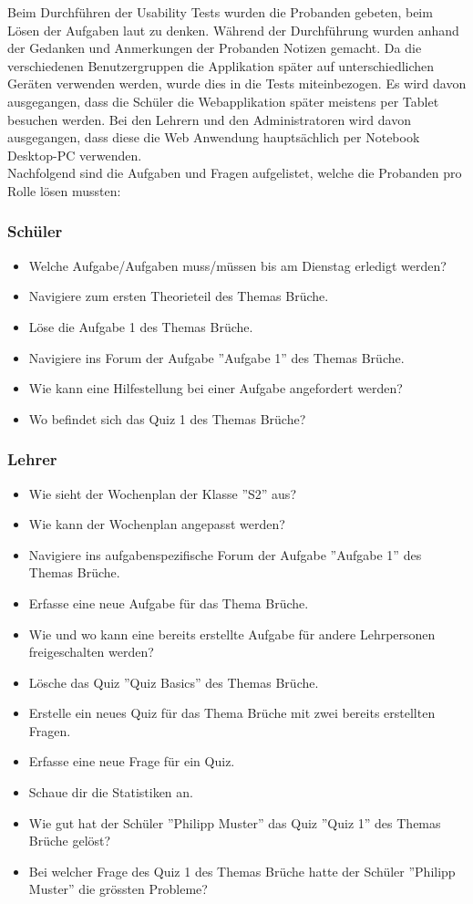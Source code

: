 Beim Durchführen der Usability Tests wurden die Probanden gebeten, beim Lösen der Aufgaben laut zu denken. Während der Durchführung wurden anhand der Gedanken und Anmerkungen der Probanden Notizen gemacht. Da die verschiedenen Benutzergruppen die Applikation später auf unterschiedlichen Geräten verwenden werden, wurde dies in die Tests miteinbezogen. Es wird davon ausgegangen, dass die Schüler die Webapplikation später meistens per Tablet besuchen werden. Bei den Lehrern und den Administratoren wird davon ausgegangen, dass diese die Web Anwendung hauptsächlich per Notebook Desktop-PC verwenden. \\

Nachfolgend sind die Aufgaben und Fragen aufgelistet, welche die Probanden pro Rolle lösen mussten:

\subsubsection*{Schüler}
\begin{itemize}
	\item Welche Aufgabe/Aufgaben muss/müssen bis am Dienstag erledigt werden?
	\item Navigiere zum ersten Theorieteil des Themas Brüche.
	\item Löse die Aufgabe 1 des Themas Brüche.
	\item Navigiere ins Forum der Aufgabe ''Aufgabe 1'' des Themas Brüche.
	\item Wie kann eine Hilfestellung bei einer Aufgabe angefordert werden?
	\item Wo befindet sich das Quiz 1 des Themas Brüche?
\end{itemize}


\subsubsection*{Lehrer}
\begin{itemize}
	\item Wie sieht der Wochenplan der Klasse ''S2'' aus?
	\item Wie kann der Wochenplan angepasst werden?
	\item Navigiere ins aufgabenspezifische Forum der Aufgabe ''Aufgabe 1'' des Themas Brüche.
	\item Erfasse eine neue Aufgabe für das Thema Brüche.
	\item Wie und wo kann eine bereits erstellte Aufgabe für andere Lehrpersonen freigeschalten werden?
	\item Lösche das Quiz ''Quiz Basics'' des Themas Brüche.
	\item Erstelle ein neues Quiz für das Thema Brüche mit zwei bereits erstellten Fragen.
	\item Erfasse eine neue Frage für ein Quiz.
	\item Schaue dir die Statistiken an.
	\item Wie gut hat der Schüler ''Philipp Muster'' das Quiz ''Quiz 1'' des Themas Brüche gelöst?
	\item Bei welcher Frage des Quiz 1 des Themas Brüche hatte der Schüler ''Philipp Muster'' die grössten Probleme?
\end{itemize}


